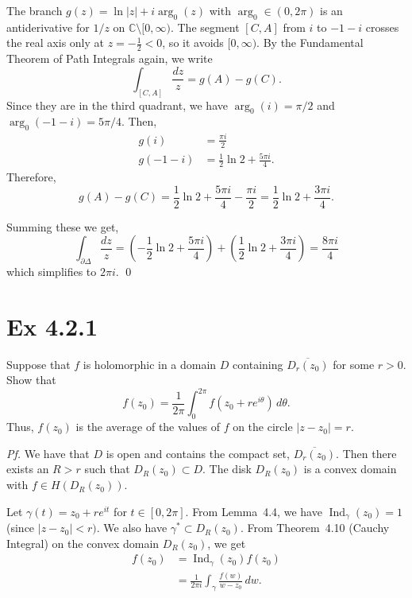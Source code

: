 \documentclass[a4paper]{article}
\begin{document}
\medskip
The branch $g(z)=\ln|z|+i\arg_0(z)$ with $\arg_0\in(0,2\pi)$ is an antiderivative for $1/z$ on $\mathbb{C}\setminus[0,\infty)$.
The segment $[C,A]$ from $i$ to $-1-i$ crosses the real axis only at $z=-\tfrac{1}{2}<0$, so it avoids $[0,\infty)$.
By the Fundamental Theorem of Path Integrals again, we write
\[
  \int_{[C,A]} \frac{dz}{z} = g(A)-g(C).
\]
Since they are in the third quadrant, we have $\arg_0(i)=\pi/2$ and $\arg_0(-1-i)=5\pi/4$. Then,
\begin{align*}
  g(i) &= \frac{\pi i}{2}\\
  g(-1-i) &= \tfrac{1}{2}\ln 2+\tfrac{5\pi i}{4}.
\end{align*}
Therefore,
\[
  g(A)-g(C) = \frac{1}{2}\ln 2+\frac{5\pi i}{4}-\frac{\pi i}{2}
  = \frac{1}{2}\ln 2+\frac{3\pi i}{4}.
\]

\medskip
Summing these we get,
\[
  \int_{\partial\Delta}\frac{dz}{z}
  = \left(-\frac{1}{2}\ln 2+\frac{5\pi i}{4}\right)
    +\left(\frac{1}{2}\ln 2+\frac{3\pi i}{4}\right)
  = \frac{8\pi i}{4}
\]
which simplifies to $2\pi i$. \qed
\newpage
\section*{Ex 4.2.1}

\begin{tcolorbox}[colback=gray!10, colframe=black, boxrule=0.5pt, arc=2mm]
Suppose that $f$ is holomorphic in a domain $D$ containing $\overline{D_r(z_0)}$
for some $r>0$. Show that
\[
  f(z_0) = \frac{1}{2\pi}\int_0^{2\pi} f(z_0+re^{i\theta})\,d\theta.
\]
Thus, $f(z_0)$ is the average of the values of $f$ on the circle $|z-z_0|=r$.
\end{tcolorbox}

\textit{Pf.} We have that $D$ is open and contains the compact set, $\overline{D_r(z_0)}$. Then there exists an $R>r$ such that $D_R(z_0)\subset D$.
The disk $D_R(z_0)$ is a convex domain with $f\in H(D_R(z_0))$.

\medskip
Let $\gamma(t)=z_0+re^{it}$ for $t\in[0,2\pi]$.
From Lemma~4.4, we have $\operatorname{Ind}_\gamma(z_0)=1$ (since $|z-z_0| < r)$. We also have $\gamma^{*}\subset D_R(z_0)$.
From Theorem~4.10 (Cauchy Integral) on the convex domain $D_R(z_0)$, we get
\begin{align*}
  f(z_0)
  &= \operatorname{Ind}_\gamma(z_0) f(z_0)\\
  &= \frac{1}{2\pi i}\int_\gamma \frac{f(w)}{w-z_0}\,dw.
\end{align*}
\end{document}
